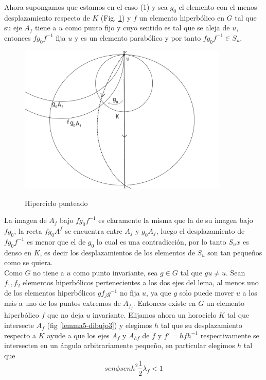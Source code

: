Ahora supongamos que estamos en el caso (1) y sea $g_{0}$ el
elemento con el menos desplazamiento respecto de $K$
(Fig. \ref{lemma5-dibujo2}) y $f$ un elemento
hiperb\'olico en $G$ tal que su eje $A_{f}$ tiene a $u$ como punto
fijo y cuyo sentido es tal que se aleja de $u$, entonces $fg_{0}f^{-1}$
fija $u$ y es un elemento parab\'olico y por tanto $fg_{0}f^{-1} \in
S_{u}$. \\

\begin{figure}[h]
  \centering
  \includegraphics[width=10cm]{lemma5-dibujo2}\\
  \caption{Hiperciclo punteado }\label{lemma5-dibujo2}
\end{figure}

La imagen de $A_{f}$ bajo $fg_{0}f^{-1}$ es claramente la misma que
la de su imagen bajo $fg_{0}$, la recta $fg_{0}A^{f}$ se encuentra
entre $A_{f}$ y $g_{0}A_{f}$, luego el desplazamiento de $fg_{0}f^{-1}$
es menor que el de $g_{0}$ lo cual es una contradicci\'on, por lo
tanto $S_{u}x$ es denso en $K$, es decir los desplazamientos de los
elementos de $S_{u}$ son tan pequeños como se quiera. \\


Como $G$ no tiene a $u$ como punto invariante, sea $g \in G$ tal que
$gu \neq u$. Sean $f_{1},f_{2}$ elementos hiperb\'olicos
pertenecientes a los dos ejes del lema, al menos uno de los
elementos hiperb\'olicos $gf_{j}g^{-1}$ no fija $u$, ya
que $g$ solo puede mover $u$ a los m\'as a uno de los puntos
extremos de $A_{f_{j}}$. Entonces existe en $G$ un elemento
hiperb\'olico $f$ que no deja $u$ invariante. Elijamos ahora un
horociclo $K$ tal que intersecte $A_{f}$ (fig \ref{lemma5-dibujo3}) y elegimos $h$ tal que su
desplazamiento respecto a $K$ ayude a que los ejes $A_{f}$ y
$A_{hf}$ de $f$ y $f'=hfh^{-1}$ respectivamente se intersecten en un
\'angulo arbitrariamente pequeño, en particular elegimos $h$ tal
que
$$sen\phi senh^{2} \frac{1}{2} \lambda_{f} < 1$$


